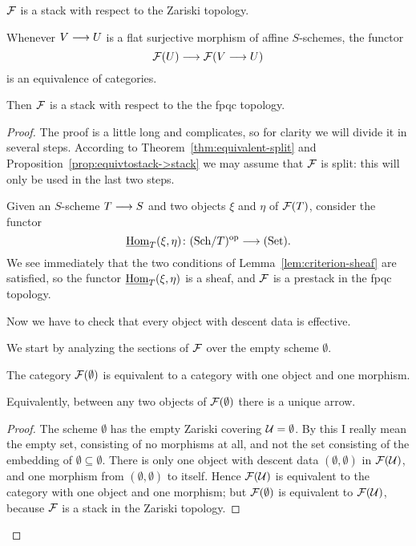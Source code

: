\begin{4   STACKS}
\begin{4.2 Descent for quasi-coherent sheaves}
\begin{lemma}
\begin{enumeratei}
\item $\cF$ is a stack with respect to the Zariski topology.

\item Whenever $V \arr U$ is a flat surjective morphism of affine $S$-schemes, the functor
   \[
   \cF(U) \arr \cF(V \to U)
   \]
is an equivalence of categories.

\end{enumeratei}

Then $\cF$ is a stack with respect to the the fpqc topology.
\end{lemma}

\begin{proof} The proof is a little long and complicates, so for clarity we will divide it in several steps. According to Theorem~\ref{thm:equivalent-split} and Proposition~\ref{prop:equivtostack->stack} we may assume that $\cF$ is split: this will only be used in the last two steps.

\steps

\step[: $\cF$ is a prestack] Given an $S$-scheme $T \arr S$ and two objects $\xi$ and $\eta$ of $\mathcal{F}(T)$, consider the functor
   \[
   \underhom_T(\xi, \eta) \colon \catsch{T}\op
   \arr \catset.
   \]
We see immediately that the two conditions of Lemma~\ref{lem:criterion-sheaf} are satisfied, so the functor $\mathop{\underline{\mathrm{Hom}}}\nolimits_T(\xi, \eta)$ is a sheaf, and $\cF$ is a prestack in the fpqc topology.

Now we have to check that every object with descent data is effective.


We start by analyzing the sections of $\cF$ over the empty scheme $\emptyset$.

\begin{lemma}
The category $\mathcal{F}(\emptyset)$ is equivalent to a category with one object and one morphism.
\end{lemma}

Equivalently, between any two objects of $\mathcal{F}(\emptyset)$ there is a unique arrow.


\begin{proof}
The scheme $\emptyset$ has the empty Zariski covering $\mathcal{U} = \emptyset$. By this I really mean the empty set, consisting of no morphisms at all, and not the set consisting of the embedding of $\emptyset \subseteq \emptyset$. There is only one object with descent data $(\emptyset, \emptyset)$ in $\mathcal{F}(\mathcal{U})$, and one morphism from $(\emptyset, \emptyset)$ to itself. Hence $\mathcal{F}(\mathcal{U})$ is equivalent to the category with one object and one morphism; but $\mathcal{F}(\emptyset)$ is equivalent to $\mathcal{F}(\mathcal{U})$, because $\cF$ is a stack in the Zariski topology.
\end{proof}


\end{proof}
\end{4.2 Descent for quasi-coherent sheaves}
\end{4   STACKS}
